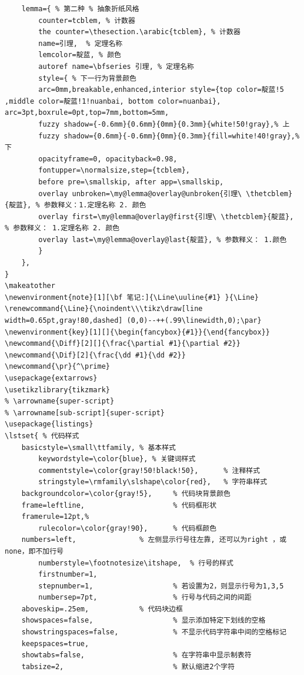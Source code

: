 \documentclass{Beautybook-V6.1}
\renewcommand{\partial}{{\text{\usefont{U}{nxlmi}{m}{it}\symbol{64}}\mspace{1mu}}}
\renewcommand{\Line}{\noindent\\\tikz\draw[line width=0.65pt,gray!80,dashed] (0,0)--++(.99\linewidth,0);\par}
\newcommand{\Diff}[2][]{\frac{\partial #1}{\partial #2}}
\newcommand{\Dif}[2]{\frac{\dd #1}{\dd #2}}
\newcommand{\pr}{^\prime}
\begin{document}
\begin{lstlisting}
    lemma={ % 第二种 % 抽象折纸风格
        counter=tcblem, % 计数器
        the counter=\thesection.\arabic{tcblem}, % 计数器
        name=引理,  % 定理名称 
        lemcolor=靛蓝, % 颜色
        autoref name=\bfseries 引理, % 定理名称
        style={ % 下一行为背景颜色
        arc=0mm,breakable,enhanced,interior style={top color=靛蓝!5 ,middle color=靛蓝!1!nuanbai, bottom color=nuanbai}, arc=3pt,boxrule=0pt,top=7mm,bottom=5mm,
        fuzzy shadow={-0.6mm}{0.6mm}{0mm}{0.3mm}{white!50!gray},% 上
        fuzzy shadow={0.6mm}{-0.6mm}{0mm}{0.3mm}{fill=white!40!gray},%下
        opacityframe=0, opacityback=0.98,
        fontupper=\normalsize,step={tcblem},
        before pre=\smallskip, after app=\smallskip,
        overlay unbroken=\my@lemma@overlay@unbroken{引理\ \thetcblem}{靛蓝}, % 参数释义：1.定理名称 2. 颜色
        overlay first=\my@lemma@overlay@first{引理\ \thetcblem}{靛蓝}, % 参数释义： 1.定理名称 2. 颜色
        overlay last=\my@lemma@overlay@last{靛蓝}, % 参数释义： 1.颜色
        }
    },
}
\makeatother
\newenvironment{note}[1][\bf 笔记:]{\Line\uuline{#1} }{\Line}
\renewcommand{\Line}{\noindent\\\tikz\draw[line width=0.65pt,gray!80,dashed] (0,0)--++(.99\linewidth,0);\par}
\newenvironment{key}[1][]{\begin{fancybox}{#1}}{\end{fancybox}}
\newcommand{\Diff}[2][]{\frac{\partial #1}{\partial #2}}
\newcommand{\Dif}[2]{\frac{\dd #1}{\dd #2}}
\newcommand{\pr}{^\prime}
\usepackage{extarrows}
\usetikzlibrary{tikzmark}
% \arrowname{super-script}
% \arrowname[sub-script]{super-script}
\usepackage{listings}
\lstset{ % 代码样式
	basicstyle=\small\ttfamily,	% 基本样式
		keywordstyle=\color{blue}, % 关键词样式
		commentstyle=\color{gray!50!black!50},   	% 注释样式
		stringstyle=\rmfamily\slshape\color{red}, 	% 字符串样式
	backgroundcolor=\color{gray!5},     % 代码块背景颜色
	frame=leftline,						% 代码框形状
	framerule=12pt,%
		rulecolor=\color{gray!90},      % 代码框颜色
	numbers=left,				% 左侧显示行号往左靠, 还可以为right ，或none，即不加行号
		numberstyle=\footnotesize\itshape,	% 行号的样式
		firstnumber=1,
		stepnumber=1,                  	% 若设置为2，则显示行号为1,3,5
		numbersep=7pt,               	% 行号与代码之间的间距
	aboveskip=.25em, 			% 代码块边框
	showspaces=false,               	% 显示添加特定下划线的空格
	showstringspaces=false,         	% 不显示代码字符串中间的空格标记
	keepspaces=true, 					
	showtabs=false,                 	% 在字符串中显示制表符
	tabsize=2,                     		% 默认缩进2个字符

\end{lstlisting}
\end{document}
